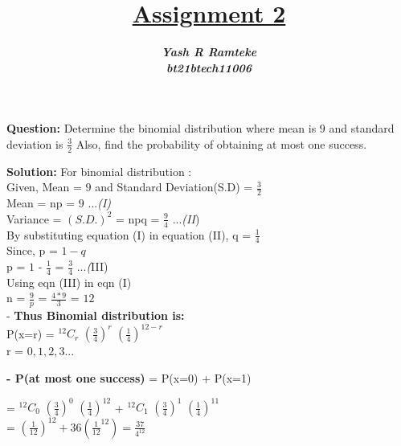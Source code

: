 \documentclass[journal,12pt,twocolumn]{IEEEtran}
\title{\textbf{\underline{Assignment 2}}}
\author{\textbf{\textit{Yash R Ramteke}}\\
\textbf{\textit{bt21btech11006}}}
\begin{document}
\maketitle

\textbf{Question:}
Determine the binomial distribution where mean is $9$ and standard deviation is $\frac{3}{2}$ Also, find the probability of obtaining at most one success.
\textbf{}

\bigskip

\textbf{Solution:}
\bigskip
For binomial distribution :\\
\bigskip
 Given, Mean = $9$ and Standard Deviation(S.D) = $\frac{3}{2}$ \\
\bigskip
Mean = np = $9$ ...\textit{(I)}\\
\bigskip
Variance = $(S.D.)^{2}$ = npq =  $\frac{9}{4}$  ...\textit{(II})\\
\bigskip
By substituting equation (I) in equation (II), q = $\frac{1}{4}$\\
\bigskip
Since, p = $1 - q$\\
\bigskip
p = $1$ - $\frac{1}{4}$ = $\frac{3}{4}$  ...\textit({III})\\
\bigskip
Using eqn (III) in eqn (I) \\
\bigskip
n = $\frac{9}{p}$ = $\frac{4 * 9}{3}$ = $12$\\
\bigskip
- \textbf{Thus Binomial distribution is:} \\
P(x=r) = $^{12}C_r$ $(\frac{3}{4})^r$ $(\frac{1}{4})^{12-r}$\\
r = $0,1,2,3...$\\
\bigskip

\textbf{- P(at most one success)} = P(x=0) + P(x=1)\\
\bigskip

= $^{12}C_0$ $(\frac{3}{4})^0$ $(\frac{1}{4})^{12}$ + $^{12}C_1$ $(\frac{3}{4})^1$ $(\frac{1}{4})^{11}$\\

\bigskip
= $(\frac{1}{12})^{12} + 36(\frac{1}{12}^{12}) = \frac{37}{4^{12}}$
                  
\end{document}
